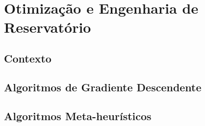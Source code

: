 \section{Otimização e Engenharia de Reservatório}
\subsection{Contexto}
\subsection{Algoritmos de Gradiente Descendente}
\subsection{Algoritmos Meta-heurísticos}
